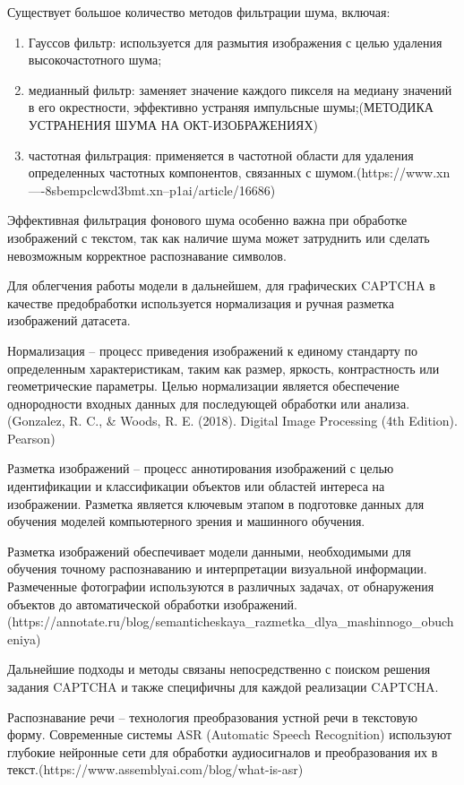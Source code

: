 Существует большое количество методов фильтрации шума, включая:

\begin{enumerate}
    \item Гауссов фильтр: используется для размытия изображения с целью удаления 
    высокочастотного шума;
    \item медианный фильтр: заменяет значение каждого пикселя на медиану значений 
    в его окрестности, эффективно устраняя импульсные шумы;(МЕТОДИКА УСТРАНЕНИЯ ШУМА НА ОКТ-ИЗОБРАЖЕНИЯХ)
    \item частотная фильтрация: применяется в частотной области для удаления 
    определенных частотных компонентов, связанных с шумом.(https://www.xn----8sbempclcwd3bmt.xn--p1ai/article/16686)
\end{enumerate}

Эффективная фильтрация фонового шума особенно важна при обработке изображений с 
текстом, так как наличие шума может затруднить или сделать невозможным корректное 
распознавание символов.

Для облегчения работы модели в дальнейшем, для графических CAPTCHA в качестве 
предобработки используется нормализация и ручная разметка изображений датасета.

Нормализация -- процесс приведения изображений к единому стандарту по 
определенным характеристикам, таким как размер, яркость, контрастность или 
геометрические параметры. Целью нормализации является обеспечение однородности 
входных данных для последующей обработки или анализа.(Gonzalez, R. C., \& Woods, R. E. (2018). Digital Image Processing (4th Edition). Pearson)

Разметка изображений -- процесс аннотирования изображений с целью идентификации 
и классификации объектов или областей интереса на изображении. Разметка является 
ключевым этапом в подготовке данных для обучения моделей компьютерного зрения и 
машинного обучения.

Разметка изображений обеспечивает модели данными, необходимыми для обучения 
точному распознаванию и интерпретации визуальной информации. Размеченные 
фотографии используются в различных задачах, от обнаружения объектов до 
автоматической обработки изображений.(https://annotate.ru/blog/semanticheskaya\_razmetka\_dlya\_mashinnogo\_obucheniya)

Дальнейшие подходы и методы связаны непосредственно с поиском решения задания 
CAPTCHA и также специфичны для каждой реализации CAPTCHA.

Распознавание речи -- технология преобразования устной речи в текстовую форму. 
Современные системы ASR (Automatic Speech Recognition) используют глубокие 
нейронные сети для обработки аудиосигналов и преобразования их в текст.(https://www.assemblyai.com/blog/what-is-asr)

